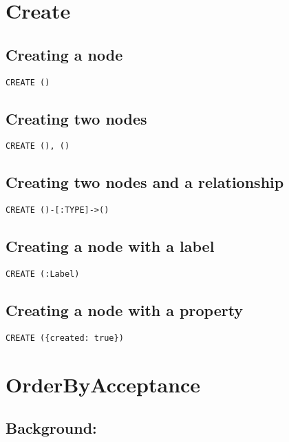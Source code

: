 \section{Create}


\subsection{Creating a node}

\begin{lstlisting}
CREATE ()
\end{lstlisting}

\subsection{Creating two nodes}

\begin{lstlisting}
CREATE (), ()
\end{lstlisting}

\subsection{Creating two nodes and a relationship}

\begin{lstlisting}
CREATE ()-[:TYPE]->()
\end{lstlisting}

\subsection{Creating a node with a label}

\begin{lstlisting}
CREATE (:Label)
\end{lstlisting}

\subsection{Creating a node with a property}

\begin{lstlisting}
CREATE ({created: true})
\end{lstlisting}
\section{OrderByAcceptance}


\subsection{Background:}

